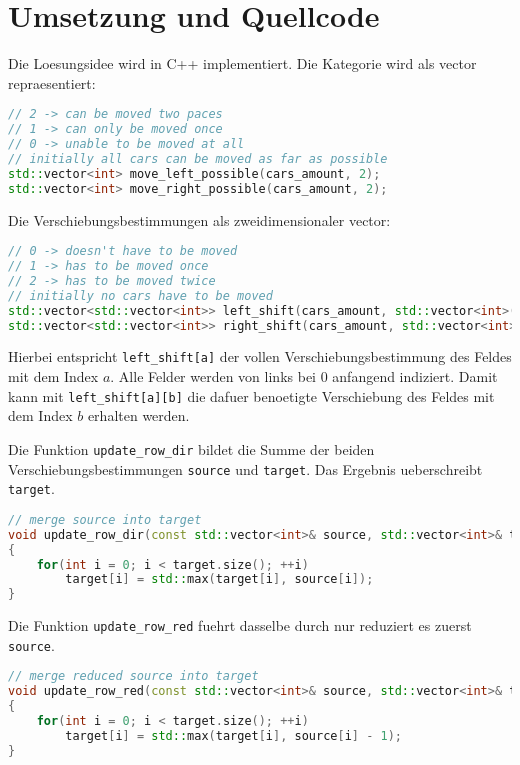 \documentclass[a4paper,10pt,ngerman]{scrartcl}
\begin{document}
\section{Umsetzung und Quellcode}
Die Loesungsidee wird in C++ implementiert.
Die Kategorie wird als vector repraesentiert:
\begin{lstlisting}[language=C++]
// 2 -> can be moved two paces
// 1 -> can only be moved once
// 0 -> unable to be moved at all
// initially all cars can be moved as far as possible
std::vector<int> move_left_possible(cars_amount, 2);
std::vector<int> move_right_possible(cars_amount, 2);
\end{lstlisting}
Die Verschiebungsbestimmungen als zweidimensionaler vector:
\begin{lstlisting}[language=C++]
// 0 -> doesn't have to be moved
// 1 -> has to be moved once
// 2 -> has to be moved twice
// initially no cars have to be moved
std::vector<std::vector<int>> left_shift(cars_amount, std::vector<int>(cars_amount, 0));
std::vector<std::vector<int>> right_shift(cars_amount, std::vector<int>(cars_amount, 0));
\end{lstlisting}
Hierbei entspricht \lstinline{left_shift[a]} der vollen Verschiebungsbestimmung des Feldes mit dem Index $a$.
Alle Felder werden von links bei $0$ anfangend indiziert.
Damit kann mit \lstinline{left_shift[a][b]} die dafuer benoetigte Verschiebung des Feldes mit dem Index $b$ erhalten werden.

Die Funktion \lstinline{update_row_dir} bildet die Summe der beiden Verschiebungsbestimmungen \lstinline{source} und \lstinline{target}.
Das Ergebnis ueberschreibt \lstinline{target}.
\begin{lstlisting}[language=C++]
// merge source into target
void update_row_dir(const std::vector<int>& source, std::vector<int>& target)
{
    for(int i = 0; i < target.size(); ++i)
        target[i] = std::max(target[i], source[i]);
}
\end{lstlisting}

Die Funktion \lstinline{update_row_red} fuehrt dasselbe durch nur reduziert es zuerst \lstinline{source}.
\begin{lstlisting}[language=C++]
// merge reduced source into target
void update_row_red(const std::vector<int>& source, std::vector<int>& target)
{
    for(int i = 0; i < target.size(); ++i)
        target[i] = std::max(target[i], source[i] - 1);
}
\end{lstlisting}
\end{document}
